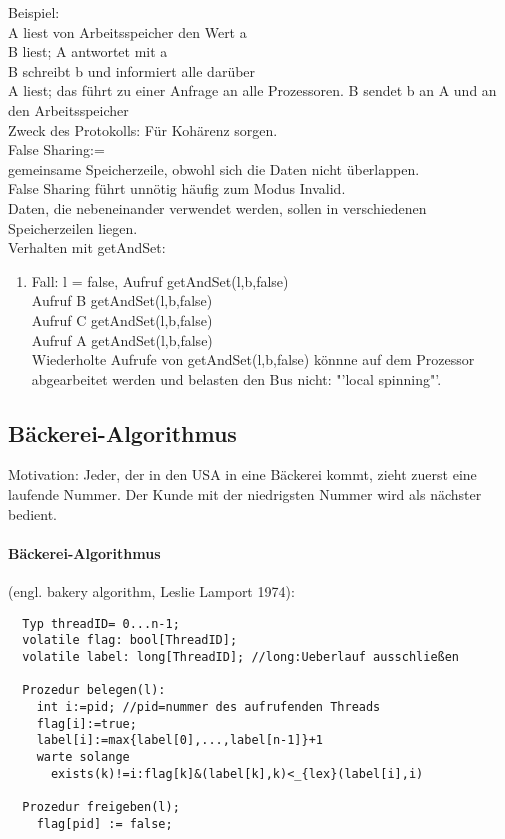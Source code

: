 \documentclass[a4paper,12pt]{scrartcl}
\begin{document}
Beispiel:\\

A liest von Arbeitsspeicher den Wert a\\


B liest; A antwortet mit a\\


B schreibt b und informiert alle darüber\\


A liest; das führt zu einer Anfrage an alle Prozessoren. B sendet b an A und an den Arbeitsspeicher\\

Zweck des Protokolls: Für Kohärenz sorgen.\\
False Sharing:=\\
gemeinsame Speicherzeile, obwohl sich die Daten nicht überlappen.\\
False Sharing führt unnötig häufig zum Modus Invalid.\\
Daten, die nebeneinander verwendet werden, sollen in verschiedenen Speicherzeilen liegen.\\
Verhalten mit getAndSet:
\begin{enumerate}
 \item Fall: l = false, Aufruf getAndSet(l,b,false)
 \\%
 Aufruf B getAndSet(l,b,false)
 \\%
 Aufruf C getAndSet(l,b,false)
 \\%
 Aufruf A getAndSet(l,b,false)\\
 Wiederholte Aufrufe von getAndSet(l,b,false) könnne auf dem Prozessor abgearbeitet werden und belasten den Bus nicht: "'local spinning"'.
\end{enumerate}

\subsection{Bäckerei-Algorithmus}

Motivation: Jeder, der in den USA in eine Bäckerei kommt, zieht zuerst eine laufende Nummer. Der Kunde mit der niedrigsten Nummer wird als nächster bedient.

\paragraph{Bäckerei-Algorithmus} (engl. bakery algorithm, Leslie Lamport 1974):\\
\begin{lstlisting}
  Typ threadID= 0...n-1;
  volatile flag: bool[ThreadID];
  volatile label: long[ThreadID]; //long:Ueberlauf ausschließen
  
  Prozedur belegen(l):
    int i:=pid; //pid=nummer des aufrufenden Threads
    flag[i]:=true;
    label[i]:=max{label[0],...,label[n-1]}+1
    warte solange
      exists(k)!=i:flag[k]&(label[k],k)<_{lex}(label[i],i)
      
  Prozedur freigeben(l);
    flag[pid] := false;
\end{lstlisting}
\end{document}
